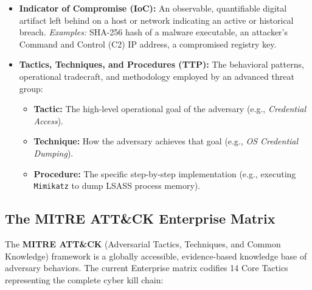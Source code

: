 \begin{itemize}
\item \textbf{Indicator of Compromise (IoC):} An observable, quantifiable digital artifact left behind on a host or network indicating an active or historical breach. \textit{Examples:} SHA-256 hash of a malware executable, an attacker's Command and Control (C2) IP address, a compromised registry key.
\item \textbf{Tactics, Techniques, and Procedures (TTP):} The behavioral patterns, operational tradecraft, and methodology employed by an advanced threat group:
\begin{itemize}
\item \textbf{Tactic:} The high-level operational goal of the adversary (e.g., \textit{Credential Access}).
\item \textbf{Technique:} How the adversary achieves that goal (e.g., \textit{OS Credential Dumping}).
\item \textbf{Procedure:} The specific step-by-step implementation (e.g., executing \texttt{Mimikatz} to dump LSASS process memory).
\end{itemize}
\end{itemize}

\subsection{The MITRE ATT\&CK Enterprise Matrix}

The \textbf{MITRE ATT\&CK} (Adversarial Tactics, Techniques, and Common Knowledge) framework is a globally accessible, evidence-based knowledge base of adversary behaviors. The current Enterprise matrix codifies 14 Core Tactics representing the complete cyber kill chain:

